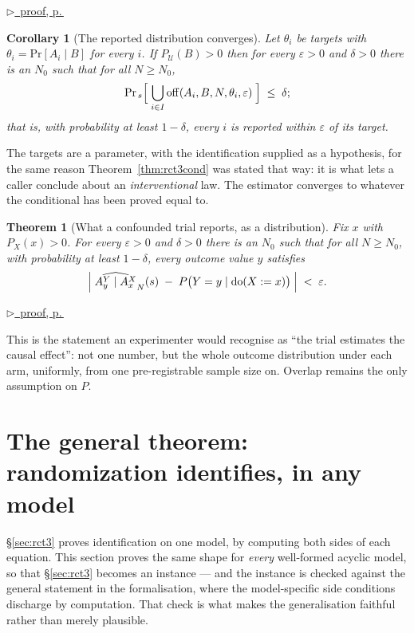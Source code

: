 \documentclass[11pt,a4paper]{article}
\theoremstyle{definition}
\theoremstyle{plain}
\newtheorem{theorem}[definition]{Theorem}
\newtheorem{corollary}[definition]{Corollary}
\theoremstyle{remark}
\newcommand{\Ctx}{\mathcal{U}}         %
\newcommand{\emp}[1]{\widehat{#1}}
\renewcommand{\Pr}{\mathrm{Pr}}
\newcommand{\pfref}[1]{%
  \par\smallskip\noindent
  \hyperref[pf:#1]{\small$\triangleright$\ proof, p.\,\pageref{pf:#1}}\par\smallskip}
\begin{document}
\pfref{thm:empcondfam}

\begin{corollary}[The reported distribution converges]
\label{cor:empcondfam}
Let $\theta_i$ be targets with $\theta_i = \Pr[A_i \mid B]$ for every $i$.
If $P_\Ctx(B) > 0$ then for every $\varepsilon > 0$ and $\delta > 0$ there
is an $N_0$ such that for all $N \ge N_0$,
\[
  \Pr_{\,s}\Bigl[\;\bigcup_{i \in I}
    \mathrm{off}(A_i,B,N,\theta_i,\varepsilon)\;\Bigr] \;\le\; \delta ;
\]
that is, with probability at least $1 - \delta$, \emph{every} $i$ is
reported within $\varepsilon$ of its target.
\end{corollary}

The targets are a parameter, with the identification supplied as a
hypothesis, for the same reason Theorem~\ref{thm:rct3cond} was stated that
way: it is what lets a caller conclude about an \emph{interventional} law.
The estimator converges to whatever the conditional has been proved equal
to.

\begin{theorem}[What a confounded trial reports, as a distribution]
\label{thm:rct3armall}
Fix $x$ with $P_X(x) > 0$. For every $\varepsilon > 0$ and $\delta > 0$
there is an $N_0$ such that for all $N \ge N_0$, with probability at least
$1 - \delta$, \emph{every} outcome value $y$ satisfies
\[
  \Bigl|\;\emp{A_y^{Y} \mid A_x^{X}}_N(s)
  \;-\; P\bigl(Y = y \mid \mathrm{do}(X := x)\bigr)\;\Bigr|
  \;<\; \varepsilon .
\]
\end{theorem}

\pfref{thm:rct3armall}

This is the statement an experimenter would recognise as ``the trial
estimates the causal effect'': not one number, but the whole outcome
distribution under each arm, uniformly, from one pre-registrable sample
size on. Overlap remains the only assumption on $P$.

\section{The general theorem: randomization identifies, in any model}
\label{sec:general}

\S\ref{sec:rct3} proves identification on one model, by computing both
sides of each equation. This section proves the same shape for
\emph{every} well-formed acyclic model, so that \S\ref{sec:rct3} becomes
an instance --- and the instance is checked against the general statement
in the formalisation, where the model-specific side conditions discharge
by computation. That check is what makes the generalisation faithful
rather than merely plausible.
\end{document}

